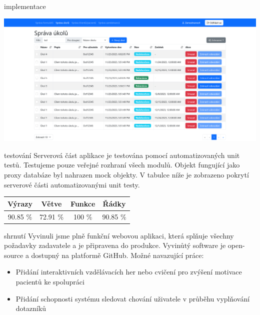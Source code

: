 \documentclass[portrait,a0paper,fontscale=0.25]{baposter}
\begin{document}
\begin{poster}
\begin{posterbox}[column=1, name=impl]{implementace}
            \begin{center}
                \includegraphics[width=\linewidth]{img/sprava-ukolu}
            \end{center}
        \end{posterbox}

        \begin{posterbox}[column=1, name=testing, below=impl]{testování}
            Serverová část aplikace je testována pomocí automatizovaných unit testů.
            Testujeme pouze veřejné rozhraní všech modulů.
            Objekt fungující jako proxy databáze byl nahrazen mock objekty.
            V tabulce níže je zobrazeno pokrytí serverové části automatizovanými unit testy.
            \begin{center}
                \begin{tabular}{c|c|c|c}
                    \textbf{Výrazy} & \textbf{Větve} & \textbf{Funkce} & \textbf{Řádky} \\
                    \hline
                    90.85 \%        & 72.91 \%       & 100 \%          & 90.85 \%       \\
                \end{tabular}
            \end{center}
        \end{posterbox}

        \begin{posterbox}[column=1, name=conclusion, below=testing]{shrnutí}
            Vyvinuli jsme plně funkční webovou aplikaci, která splňuje všechny požadavky zadavatele a je připravena do produkce.
            Vyvinůtý software je open-source a dostupný na platformě GitHub.
            Možné navazující práce:
            \begin{itemize}
                \item Přidání interaktivních vzdělávacích her nebo cvičení pro zvýšení motivace pacientů ke spolupráci
                \item Přidání schopnosti systému sledovat chování uživatele v průběhu vyplňování dotazníků
            \end{itemize}
        \end{posterbox}


\end{poster}
\end{document}
